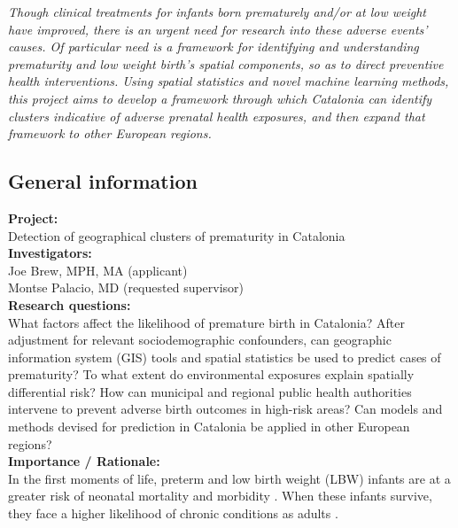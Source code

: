 \documentclass{article}
\begin{document}
\noindent \emph{Though clinical treatments for infants born prematurely and/or at low weight have improved, there is an urgent need for research into these adverse events' causes.  Of particular need is a framework for identifying and understanding prematurity and low weight birth's spatial components, so as to direct preventive health interventions.  Using spatial statistics and novel machine learning methods, this project aims to develop a framework through which Catalonia can identify clusters indicative of adverse prenatal health exposures, and then expand that framework to other European regions.} 


\newpage

\begin{multicols}{2}



\subsection*{General information}

\noindent \textbf{Project:}\\ Detection of geographical clusters of prematurity in Catalonia \\

\noindent \textbf{Investigators:} \\ Joe Brew, MPH, MA (applicant) \\ Montse Palacio, MD (requested supervisor) \\


\noindent \textbf{Research questions:}\\ What factors affect the likelihood of premature birth in Catalonia?  After adjustment for relevant sociodemographic confounders, can geographic information system (GIS) tools and spatial statistics be used to predict cases of prematurity?  To what extent do environmental exposures explain spatially differential risk? How can municipal and regional public health authorities intervene to prevent adverse birth outcomes in high-risk areas? Can models and methods devised for prediction in Catalonia be applied in other European regions?    \\

\noindent \textbf{Importance / Rationale:}\\  In the first moments of life, preterm and low birth weight (LBW) infants are at a greater risk of neonatal mortality \cite{Tsai2014,Anderson2014} and morbidity \cite{Yeung2014,Merkestein2014}.   When these infants survive, they face a higher likelihood of chronic conditions as adults \cite{Visentin2014,Lane2014}.  \\ 


\end{multicols}
\end{document}

